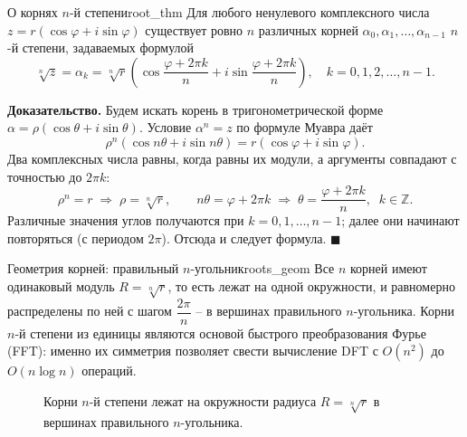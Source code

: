 \documentclass[12pt,a4paper]{article}
\newenvironment{myproof}{\noindent\textbf{Доказательство.}}{\hfill$\blacksquare$}
\begin{document}
\begin{theorem}{О корнях $n$-й степени}{root_thm}
Для любого ненулевого комплексного числа
$z = r(\cos\varphi + i\sin\varphi)$ существует ровно $n$ различных
корней $\alpha_0, \alpha_1, \dots, \alpha_{n-1}$ $n$-й степени,
задаваемых формулой
\[
\sqrt[n]{z} = \alpha_k = \sqrt[n]{r}\!\left(
\cos\frac{\varphi + 2\pi k}{n}
+ i\sin\frac{\varphi + 2\pi k}{n}\right),
\quad k = 0, 1, 2, \dots, n-1.
\]
\end{theorem}

\begin{myproof}
Будем искать корень в тригонометрической форме
$\alpha = \rho(\cos\theta + i\sin\theta)$. Условие $\alpha^n = z$ по
формуле Муавра даёт
\[
\rho^n(\cos n\theta + i\sin n\theta)
= r(\cos\varphi + i\sin\varphi).
\]
Два комплексных числа равны, когда равны их модули, а аргументы
совпадают с точностью до $2\pi k$:
\[
\rho^n = r \;\Rightarrow\; \rho = \sqrt[n]{r}, \qquad
n\theta = \varphi + 2\pi k \;\Rightarrow\;
\theta = \frac{\varphi + 2\pi k}{n}, \;\; k \in \mathbb{Z}.
\]
Различные значения углов получаются при $k = 0, 1, \dots, n-1$;
далее они начинают повторяться (с периодом $2\pi$). Отсюда и следует
формула.
\end{myproof}

\begin{remarkIT}{Геометрия корней: правильный $n$-угольник}{roots_geom}
Все $n$ корней имеют одинаковый модуль $R = \sqrt[n]{r}$, то есть
лежат на одной окружности, и равномерно распределены по ней с шагом
$\dfrac{2\pi}{n}$ -- в вершинах правильного $n$-угольника. Корни
$n$-й степени из единицы являются основой быстрого преобразования
Фурье (FFT): именно их симметрия позволяет свести вычисление DFT с
$O(n^2)$ до $O(n\log n)$ операций.
\end{remarkIT}

\begin{figure}[h!]
\centering
{}
\caption{Корни $n$-й степени лежат на окружности радиуса
$R = \sqrt[n]{r}$ в вершинах правильного $n$-угольника.}
\label{fig:roots}
\end{figure}
\end{document}

